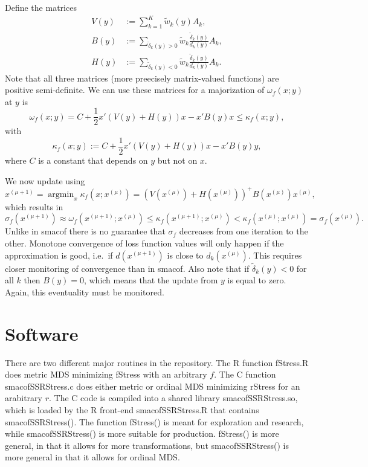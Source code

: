\documentclass[
  12pt,
  letterpaper,
  DIV=11,
  numbers=noendperiod]{scrartcl}
\begin{document}
Define the matrices \begin{subequations}
\begin{align}
V(y)&:=\sum_{k=1}^K\tilde w_k(y)A_k,\\
B(y)&:=\sum_{\tilde\delta_k(y)>0}\tilde w_k\frac{\tilde\delta_k(y)}{d_k(y)}A_k,\\
H(y)&:=\sum_{\tilde\delta_k(y)<0}\tilde w_k\frac{\tilde\delta_k(y)}{d_k(y)}A_k.
\end{align}
\end{subequations} Note that all three matrices (more preecisely
matrix-valued functions) are positive semi-definite. We can use these
matrices for a majorization of \(\omega_f(x;y)\) at \(y\) is
\begin{equation}
\omega_f(x;y)=C+\frac12 x'(V(y)+H(y))x-x'B(y)x\leq\kappa_f(x;y),\label{eq-matmajx}
\end{equation} with \begin{equation}
\kappa_f(x;y):=C+\frac12 x'(V(y)+H(y))x-x'B(y)y,\label{eq-matmajy}
\end{equation} where \(C\) is a constant that depends on \(y\) but not
on \(x\).

We now update using \[
x^{(\mu+1)}=\mathop{\text{argmin}}_x\kappa_f(x;x^{(\mu)})=(V(x^{(\mu)})+H(x^{(\mu)}))^+B(x^{(\mu)})x^{(\mu)},
\] which results in \[
\sigma_f(x^{(\mu+1)})\approx\omega_f(x^{(\mu+1)};x^{(\mu)})\leq\kappa_f(x^{(\mu+1)};x^{(\mu)})<\kappa_f(x^{(\mu)};x^{(\mu)})=\sigma_f(x^{(\mu)}).
\] Unlike in smacof there is no guarantee that \(\sigma_f\) decreases
from one iteration to the other. Monotone convergence of loss function
values will only happen if the approximation is good, i.e.~if
\(d(x^{(\mu+1)})\) is close to \(d_k(x^{(\mu)})\). This requires closer
monitoring of convergence than in smacof. Also note that if
\(\tilde\delta_k(y)<0\) for all \(k\) then \(B(y)=0\), which means that
the update from \(y\) is equal to zero. Again, this eventuality must be
monitored.

\section{Software}\label{software}

There are two different major routines in the repository. The R function
fStress.R does metric MDS minimizing fStress with an arbitrary \(f\).
The C function smacofSSRStress.c does either metric or ordinal MDS
minimizing rStress for an arabitrary \(r\). The C code is compiled into
a shared library smacofSSRStress.so, which is loaded by the R front-end
smacofSSRStress.R that contains smacofSSRStress(). The function
fStress() is meant for exploration and research, while smacofSSRStress()
is more suitable for production. fStress() is more general, in that it
allows for more transformations, but smacofSSRStress() is more general
in that it allows for ordinal MDS.
\end{document}
